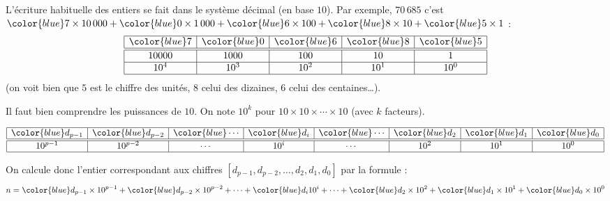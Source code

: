 \documentclass[11pt,class=report,crop=false]{standalone}
\begin{document}
\newcommand{\badletter}[1]{\underline{\textcolor{red}{#1}}}







\begin{cours}


L'écriture habituelle des entiers se fait dans le système décimal (en base $10$). Par exemple, $70\,685$ c'est 
${\color{blue}7} \times 10\,000
+{\color{blue}0} \times 1\,000
+{\color{blue}6} \times 100
+{\color{blue}8} \times 10 
+{\color{blue}5} \times 1$ : 
$$
\begin{array}{|c|c|c|c|c|}
  \hline
  {\color{blue}7} & {\color{blue}0} & {\color{blue}6} & {\color{blue}8} & {\color{blue}5} \\ 
  \hline\hline
  10000 & 1000 & 100 & 10 & 1 \\\hline
  10^4 & 10^3 & 10^2 & 10^1 & 10^0 \\
  \hline
\end{array}
$$   
(on voit bien que $5$ est le chiffre des unités, $8$ celui des dizaines, $6$ celui des centaines\ldots). 

Il faut bien comprendre les puissances de $10$. On note $10^k$ pour $10 \times 10 \times \cdots \times 10$ (avec $k$ facteurs).

$$
\begin{array}{|c|c|c|c|c|c|c|c|}
  \hline
  {\color{blue}d_{p-1}} & {\color{blue}d_{p-2}}& {\color{blue}\cdots} & {\color{blue}d_i}& {\color{blue}\cdots} & {\color{blue}d_2} & {\color{blue}d_1} & {\color{blue}d_0} \\ 
  \hline\hline
  10^{p-1} & 10^{p-2} & \cdots & 10^i &\cdots & 10^2 & 10^1 & 10^0 \\
  \hline
\end{array}
$$   
  
On calcule donc l'entier correspondant aux chiffres $[d_{p-1},d_{p-2}, \ldots,d_2,d_1,d_0]$ par la formule :
$$n = {\color{blue}d_{p-1}} \times 10^{p-1} + {\color{blue}d_{p-2}} \times 10^{p-2} + \cdots + {\color{blue}d_i} 10^{i} +  \cdots + {\color{blue}d_2} \times 10^2 + {\color{blue}d_1} \times 10^1 + {\color{blue}d_0} \times 10^0$$
\end{cours}
\end{document}
